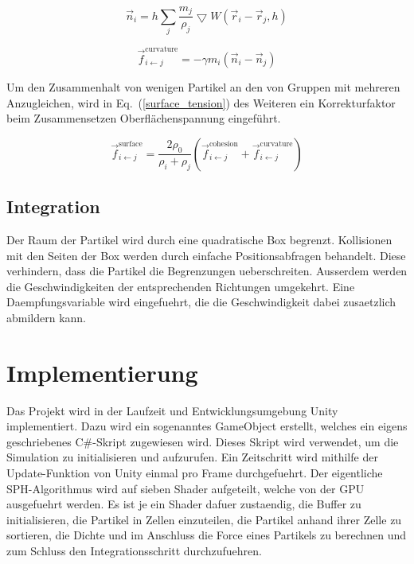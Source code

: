 \documentclass[a4paper]{paper}
\renewcommand{\eqref}[1]{Eq.~(\ref{#1})}
\begin{document}
\begin{equation}
\label{normal}
\vec{n}_{i} = h\sum_{j}\frac{m_{j}}{\rho_{j}}\bigtriangledown W (\vec{r}_{i}-\vec{r}_{j},h)
\end{equation}

\begin{equation}
\label{curvature}
\vec{f}_{i\leftarrow j}^{\text{curvature}} = -\gamma m_{i}(\vec{n}_i - \vec{n}_j)
\end{equation}

Um den Zusammenhalt von wenigen Partikel an den von Gruppen mit mehreren Anzugleichen, wird in \eqref{surface_tension} des Weiteren ein Korrekturfaktor beim Zusammensetzen Oberflächenspannung eingeführt.

\begin{equation}
	\label{surface_tension}
	\vec{f}_{i\leftarrow j}^{\text{surface}} = \frac{2\rho_{0}}{\rho_{i}+\rho_{j}} (\vec{f}_{i\leftarrow j}^{\text{cohesion}} + \vec{f}_{i\leftarrow j}^{\text{curvature}})
\end{equation}


\subsection{Integration}

Der Raum der Partikel wird durch eine quadratische Box begrenzt. Kollisionen mit den Seiten der Box werden durch einfache Positionsabfragen behandelt. Diese verhindern, dass die Partikel die Begrenzungen ueberschreiten. Ausserdem werden die Geschwindigkeiten der entsprechenden Richtungen umgekehrt. Eine Daempfungsvariable wird eingefuehrt, die die Geschwindigkeit dabei zusaetzlich abmildern kann.

\section{Implementierung}
Das Projekt wird in der Laufzeit und Entwicklungsumgebung Unity implementiert. Dazu wird ein sogenanntes GameObject erstellt, welches ein eigens geschriebenes C\#-Skript zugewiesen wird. Dieses Skript wird verwendet, um die Simulation zu initialisieren und aufzurufen. %
Ein Zeitschritt wird mithilfe der Update-Funktion von Unity einmal pro Frame durchgefuehrt. Der eigentliche SPH-Algorithmus wird auf sieben Shader aufgeteilt, welche von der GPU ausgefuehrt werden. Es ist je ein Shader dafuer zustaendig, die Buffer zu initialisieren, die Partikel in Zellen einzuteilen, die Partikel anhand ihrer Zelle zu sortieren, die Dichte und im Anschluss die Force eines Partikels zu berechnen und zum Schluss den Integrationsschritt durchzufuehren.
\end{document}
